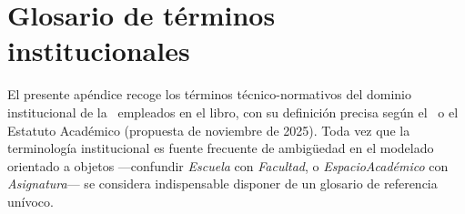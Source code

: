 

\chapter{Glosario de términos institucionales}
\label{apx:glosario}

\noindent
El presente apéndice recoge los términos técnico-normativos del dominio
institucional de la \ud\ empleados en el libro, con su definición precisa
según el \acuerdo\ o el Estatuto Académico (propuesta de noviembre de
2025). Toda vez que la terminología institucional es fuente frecuente
de ambigüedad en el modelado orientado a objetos ---confundir
\textit{Escuela} con \textit{Facultad}, o \textit{EspacioAcadémico}
con \textit{Asignatura}--- se considera indispensable disponer de
un glosario de referencia unívoco.

\bigskip

